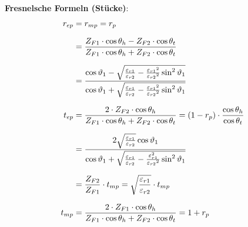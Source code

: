 \textbf{Fresnelsche Formeln (Stücke)}:
\begin{equation*}
		\setlength{\jot}{10pt}
	\begin{aligned}
		r_{ep}    & =  r_{mp} = r_{p}                                                                                                                                                                                                     \\
		& = \frac{Z_{F1} \cdot \cos \theta_h-Z_{F2} \cdot \cos \theta_t}{Z_{F1} \cdot \cos \theta_h+Z_{F2} \cdot \cos \theta_t}
		\\
		& =\frac{\cos \vartheta_1-\sqrt{\frac{\varepsilon_{r 1}}{\varepsilon_{r 2}}-\frac{\varepsilon_{r 1}{ }^2}{\varepsilon_{r 2}{ }^2} \sin ^2 \vartheta_1}}{\cos \vartheta_1+\sqrt{\frac{\varepsilon_{r 1}}{\varepsilon_{r 2}}-\frac{\varepsilon_{r 1}{ }^2}{\varepsilon_{r 2}{ }^2} \sin ^2 \vartheta_1}} \\
		t_{ep} & =  \frac{2 \cdot Z_{F2}   \cdot  \cos \theta_h}{Z_{F1} \cdot \cos \theta_h+Z_{F2} \cdot \cos \theta_t}                                                                                                                           = (1-r_p) \cdot \dfrac{\cos \theta_h}{\cos \theta_t}                                                                                                                                                                        \\
		& = \frac{2 \sqrt{\frac{\varepsilon_{r 1}}{\varepsilon_{r 2}}} \cos \vartheta_1}{\cos \vartheta_1+\sqrt{\frac{\varepsilon_{r 1}}{\varepsilon_{r 2}}-\frac{\varepsilon_{r 1}^2}{\varepsilon_{r 2}{ }^2} \sin ^2 \vartheta_1}} \\
		& = \frac{Z_{F2}}{Z_{F1}}\cdot t_{mp} = \sqrt{\frac{\varepsilon_{r1}}{\varepsilon_{r2}}}\cdot t_{mp} \\
		t_{mp} & = \frac{2 \cdot  Z_{F1}\cdot \cos \theta_h}{Z_{F1} \cdot \cos \theta_h+Z_{F2} \cdot \cos \theta_t}                                                                                                                          
		= 1+r_p                                                                                                                                                                                                                
	\end{aligned}
\end{equation*}
